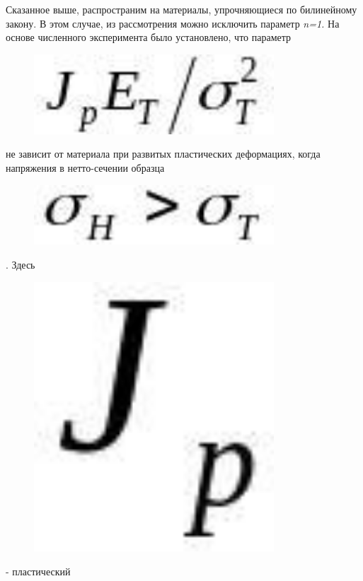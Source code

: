Сказанное выше, распространим на материалы, упрочняющиеся по билинейному
закону. В этом случае, из рассмотрения можно исключить параметр
\emph{n=1.} На основе численного эксперимента было установлено, что
параметр \begin{figure}[H]
	\centering
	\includegraphics[width=0.8\textwidth]{assets/1159}
	\caption*{}
\end{figure} не зависит от материала при
развитых пластических деформациях, когда напряжения в нетто-сечении
образца \begin{figure}[H]
	\centering
	\includegraphics[width=0.8\textwidth]{assets/1160}
	\caption*{}
\end{figure}. Здесь
\begin{figure}[H]
	\centering
	\includegraphics[width=0.8\textwidth]{assets/1161}
	\caption*{}
\end{figure}- пластический
